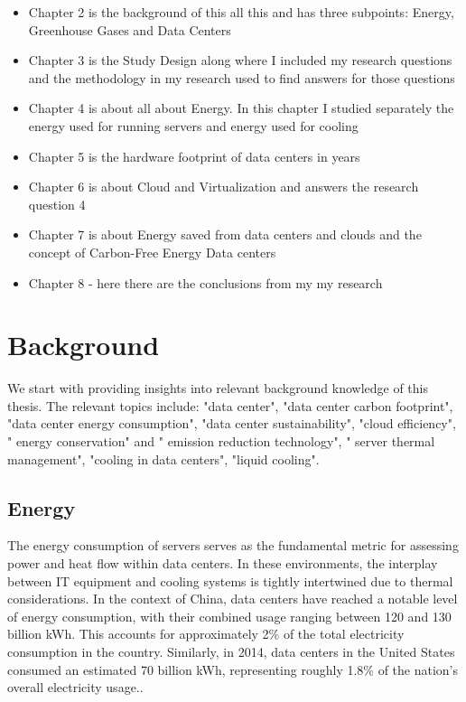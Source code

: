 \documentclass[
  a4paper,  %
  twoside,  %
  bibliography=totoc,
  headsepline,
  cleardoublepage=empty,
  parskip=half,
  draft=false
]{scrbook}
\begin{document}
\begin{itemize}
	\item Chapter 2 is the background of this all this and has three subpoints: Energy, Greenhouse Gases and Data Centers
	\item Chapter 3 is the Study Design along where I included my research questions and the methodology in my research used to find answers for those questions
	\item Chapter 4 is about all about Energy. In this chapter I studied separately the energy used for running servers and energy used for cooling
	\item Chapter 5 is the hardware footprint of data centers in years
	\item Chapter 6 is about Cloud and Virtualization and answers the research question 4
	\item Chapter 7 is about Energy saved from data centers and clouds and the concept of Carbon-Free Energy Data centers
	\item Chapter 8 - here there are the conclusions from my my research 
\end{itemize}



\chapter{Background}

We start with providing insights into relevant background knowledge of this thesis. The relevant topics include: "data center", "data center carbon footprint", "data center energy consumption", "data center sustainability", "cloud efficiency", " energy conservation" and " emission reduction technology", " server thermal management", "cooling in data centers", "liquid cooling". 


\section{Energy}
The energy consumption of servers serves as the fundamental metric for assessing power and heat flow within data centers. In these environments, the interplay between IT equipment and cooling systems is tightly intertwined due to thermal considerations. In the context of China, data centers have reached a notable level of energy consumption, with their combined usage ranging between 120 and 130 billion kWh. This accounts for approximately 2\% of the total electricity consumption in the country. Similarly, in 2014, data centers in the United States consumed an estimated 70 billion kWh, representing roughly 1.8\% of the nation's overall electricity usage.\cite{JIN2020114806}. 
\end{document}
